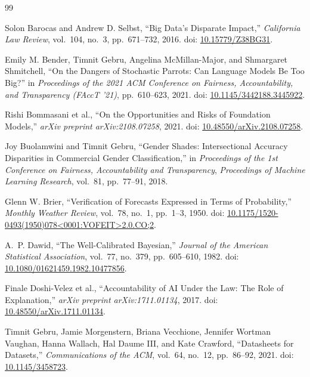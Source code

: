 \documentclass[11pt]{article}
\begin{document}
\begin{thebibliography}{99}

Solon Barocas and Andrew D. Selbst,
``Big Data's Disparate Impact,''
\textit{California Law Review},
vol.~104, no.~3, pp.~671--732, 2016.
doi: \href{https://doi.org/10.15779/Z38BG31}
{10.15779/Z38BG31}.

Emily M. Bender, Timnit Gebru, Angelina McMillan-Major, and
Shmargaret Shmitchell,
``On the Dangers of Stochastic Parrots:
Can Language Models Be Too Big?''
in \textit{Proceedings of the 2021 ACM Conference on
Fairness, Accountability, and Transparency (FAccT '21)},
pp.~610--623, 2021.
doi: \href{https://doi.org/10.1145/3442188.3445922}
{10.1145/3442188.3445922}.

Rishi Bommasani et al.,
``On the Opportunities and Risks of Foundation Models,''
\textit{arXiv preprint arXiv:2108.07258}, 2021.
doi: \href{https://doi.org/10.48550/arXiv.2108.07258}
{10.48550/arXiv.2108.07258}.

Joy Buolamwini and Timnit Gebru,
``Gender Shades: Intersectional Accuracy Disparities in
Commercial Gender Classification,''
in \textit{Proceedings of the 1st Conference on Fairness,
Accountability and Transparency},
\textit{Proceedings of Machine Learning Research},
vol.~81, pp.~77--91, 2018.

Glenn W. Brier,
``Verification of Forecasts Expressed in Terms of Probability,''
\textit{Monthly Weather Review},
vol.~78, no.~1, pp.~1--3, 1950.
doi: \href{https://doi.org/10.1175/1520-0493(1950)078%
<0001:VOFEIT>2.0.CO;2}
{10.1175/1520-0493(1950)078<0001:VOFEIT>2.0.CO;2}.

A.~P. Dawid,
``The Well-Calibrated Bayesian,''
\textit{Journal of the American Statistical Association},
vol.~77, no.~379, pp.~605--610, 1982.
doi: \href{https://doi.org/10.1080/01621459.1982.10477856}
{10.1080/01621459.1982.10477856}.

Finale Doshi-Velez et al.,
``Accountability of AI Under the Law:
The Role of Explanation,''
\textit{arXiv preprint arXiv:1711.01134}, 2017.
doi: \href{https://doi.org/10.48550/arXiv.1711.01134}
{10.48550/arXiv.1711.01134}.

Timnit Gebru, Jamie Morgenstern, Briana Vecchione,
Jennifer Wortman Vaughan, Hanna Wallach,
Hal Daume III, and Kate Crawford,
``Datasheets for Datasets,''
\textit{Communications of the ACM},
vol.~64, no.~12, pp.~86--92, 2021.
doi: \href{https://doi.org/10.1145/3458723}
{10.1145/3458723}.


\end{thebibliography}
\end{document}
